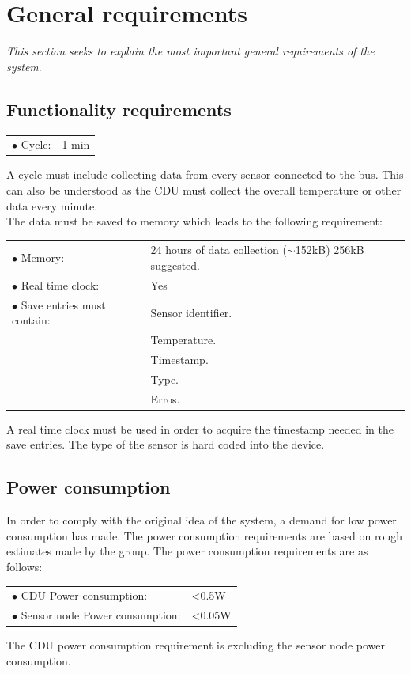 \section{General requirements}
\textit{This section seeks to explain the most important general requirements of the system}.
\subsection{Functionality requirements}
\begin{table}[H]
\begin{tabular}{p{8cm} p{2cm}}
$\bullet$ Cycle: & 1 min\\
\end{tabular}
\end{table}
A cycle must include collecting data from every sensor connected to the bus. This can also be understood as the CDU must collect the overall temperature or other data every minute.\\
The data must be saved to memory which leads to the following requirement:
\begin{table}[H]
\begin{tabular}{p{8cm} p{5cm}}
$\bullet$ Memory: & 24 hours of data collection ($\sim$152kB) 256kB suggested.\\
$\bullet$ Real time clock: & Yes\\
$\bullet$ Save entries must contain: &Sensor identifier. \\
~ 									&Temperature. \\
~									&Timestamp. \\
~									&Type. \\
~									&Erros. \\
\end{tabular}
\end{table}
A real time clock must be used in order to acquire the timestamp needed in the save entries. The type of the sensor is hard coded into the device.
\subsection{Power consumption}
In order to comply with the original idea of the system, a demand for low power consumption has made. The power consumption requirements are based on rough estimates made by the group. The power consumption requirements are as follows:
\begin{table}[H]
	\begin{tabular}{p{8cm} p{2cm}}
	$\bullet$ CDU Power consumption: & <0.5W\\
	$\bullet$ Sensor node Power consumption: & <0.05W\\
	\end{tabular}
\end{table}
The CDU power consumption requirement is excluding the sensor node power consumption.
